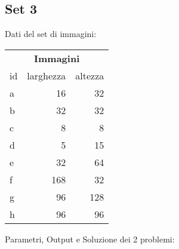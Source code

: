 




\subsection{Set 3}
Dati del set di immagini: 

\begin{table}[H]
\centering
\footnotesize
\begin{tabular}{l|r|r}
\multicolumn{3}{c}{\textbf{Immagini}} \\ 
id & larghezza & altezza \\
\hline
a & 16 & 32 \\
b & 32&32\\
c & 8& 8\\
d & 5&15\\
e & 32&64\\
f & 168 &32\\
g & 96&128\\
h & 96& 96\\
\end{tabular}
\end{table}


\noindent Parametri, Output e Soluzione dei 2 problemi: 

